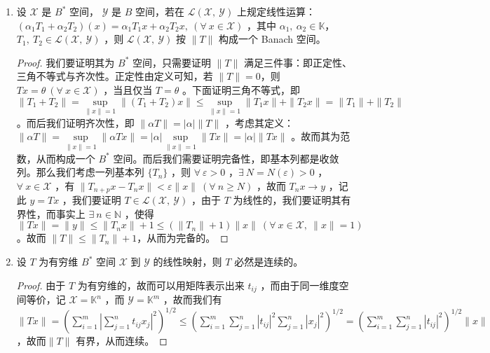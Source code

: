 \begin{enumerate}[leftmargin=2cm, label=\arabic*]
\begin{proof}
    必要性：若 $T$ 连续，则我们考虑另一种方式来证明，由于其连续，则 $\forall\ \|x\|_{\mathscr{X}}\leqslant \delta$，$\|Tx\|_{\mathscr{Y}} \leqslant \varepsilon$ ，那么我们考虑 $\|x_0\|\leqslant \delta$ ，取 $y\in D(T)$ ，考虑$x = \frac{y}{\|y\|x_0}\delta$ ，则 $\|Tx\|_{\mathscr{Y}} = \frac{\delta}{\|y\| x_0} \|Ty\|_{\mathscr{Y}} < \varepsilon$ ，故而有 $\|Ty\|_{\mathscr{Y}} < \varepsilon \frac{x_0}{\delta} \|y\| \leqslant M \|y\|$ ，故而其有界。\textcolor{blue}{我们亦可考虑利用反证法，原理同上。}
\end{proof}
    \item 设 $\mathscr{X}$ 是 $B^*$ 空间， $\mathscr{Y}$ 是 $B$ 空间，若在 $\mathscr{L}(\mathscr{X},\ \mathscr{Y})$ 上规定线性运算：$(\alpha_1 T_1 + \alpha_2 T_2) (x) = \alpha_1 T_1 x + \alpha_2 T_2 x,\ (\forall\ x\in \mathscr{X})$ ，其中 $\alpha_1,\ \alpha_2\in\mathbb{K}$，$T_1,\ T_2\in\mathscr{L}(\mathscr{X},\ \mathscr{Y})$ ，则 $\mathscr{L}(\mathscr{X},\ \mathscr{Y})$ 按 $\|T\|$ 构成一个 Banach 空间。
\begin{proof}
    我们要证明其为 $B^*$ 空间，只需要证明 $\|T\|$ 满足三件事：即正定性、三角不等式与齐次性。正定性由定义可知，若 $\|T\| = 0$，则 $Tx = \theta\ (\forall\ x\in\mathscr{X})$   ，当且仅当 $T = \theta$ 。下面证明三角不等式，即 $\|T_1 + T_2\| = \sup\limits_{\|x\|=1} \|(T_1 + T_2)x\| \leqslant \sup\limits_{\|x\|=1} \|T_1x\| + \|T_2x\| = \|T_1\| + \|T_2\|$ 。而后我们证明齐次性，即 $\|\alpha T\| = |\alpha| \|T\|$ ，考虑其定义：$\|\alpha T\| = \sup\limits_{\|x\| = 1} \|\alpha T x\| = |\alpha| \sup\limits_{\|x\|=1} \|Tx\|  = |\alpha| \|Tx\|$ 。故而其为范数，从而构成一个 $B^*$ 空间。而后我们需要证明完备性，即基本列都是收敛列。那么我们考虑一列基本列 $\{T_n\}$ ，则 $\forall\ \varepsilon > 0$ ，$\exists\ N = N(\varepsilon) > 0$ ，$\forall\ x\in\mathscr{X}$ ，有 $\|T_{n+p}x - T_n x\| < \varepsilon\|x\| \ (\forall\ n\geqslant N)$ ，故而 $T_n x \to y$ ，记此 $y = Tx$ ，我们要证明 $T\in \mathscr{L}(\mathscr{X},\ \mathscr{Y})$ ，由于 $T$ 为线性的，我们要证明其有界性，而事实上 $\exists\ n\in\mathbb{N}$ ，使得 $\|Tx\| = \|y\| \leqslant \|T_nx\| + 1 \leqslant (\|T_n\| + 1) \|x\| \ (\forall\ x\in\mathscr{X},\ \|x\| = 1) $。故而 $\|T\| \leqslant \|T_n\| + 1$，从而为完备的。
\end{proof}
    \item 设 $T$ 为有穷维 $B^*$ 空间 $\mathscr{X}$ 到 $\mathscr{Y}$ 的线性映射，则 $T$ 必然是连续的。
\begin{proof}
    由于 $T$ 为有穷维的，故而可以用矩阵表示出来 $t_{ij}$ ，而由于同一维度空间等价，记 $\mathscr{X} = \mathbb{K}^n$ ，而 $\mathscr{Y} = \mathbb{K}^m$ ，故而我们有 $\|Tx\| = \left(\sum\limits_{i=1}^m\left|\sum\limits_{j=1}^n t_{ij}x_j\right|^2 \right)^{1/2} \leqslant \left(\sum\limits_{i=1}^m \sum\limits_{j=1}^n |t_{ij}|^2 \sum\limits_{j=1}^n |x_j|^2 \right)^{1/2} = \left(\sum\limits_{i=1}^m \sum\limits_{j=1}^n |t_{ij}|^2 \right)^{1/2}\|x\|$ ，故而$\|T\|$ 有界，从而连续。 

\end{proof}
\end{enumerate}

